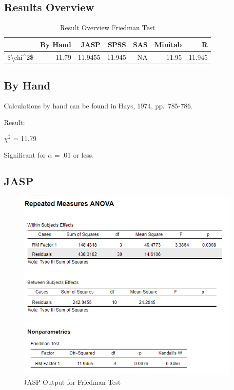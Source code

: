 \documentclass[
]{book}
\begin{document}
\hypertarget{results-overview-4}{%
\subsection{Results Overview}\label{results-overview-4}}

\begin{table}

\caption{\label{tab:unnamed-chunk-63}Result Overview Friedman Test}
\centering
\begin{tabular}[t]{lrrrrrr}
\toprule
  & By Hand & JASP & SPSS & SAS & Minitab & R\\
\midrule
\$\textbackslash{}chi\textasciicircum{}2\$ & 11.79 & 11.9455 & 11.945 & NA & 11.95 & 11.945\\
\bottomrule
\end{tabular}
\end{table}

\hypertarget{by-hand-4}{%
\subsection{By Hand}\label{by-hand-4}}

Calculations by hand can be found in Hays, 1974, pp.~785-786.

Result:

\(\chi^2\) = 11.79

Significant for \(\alpha\) = .01 or less.

\hypertarget{jasp-4}{%
\subsection{JASP}\label{jasp-4}}

\begin{figure}[!h]
\includegraphics{Screenshots/Friedman Test/FriedmanJASP} \caption{\label{fig:FriedmanJASP}JASP Output for Friedman Test}\label{fig:FriedmanJASP}
\end{figure}
\end{document}
